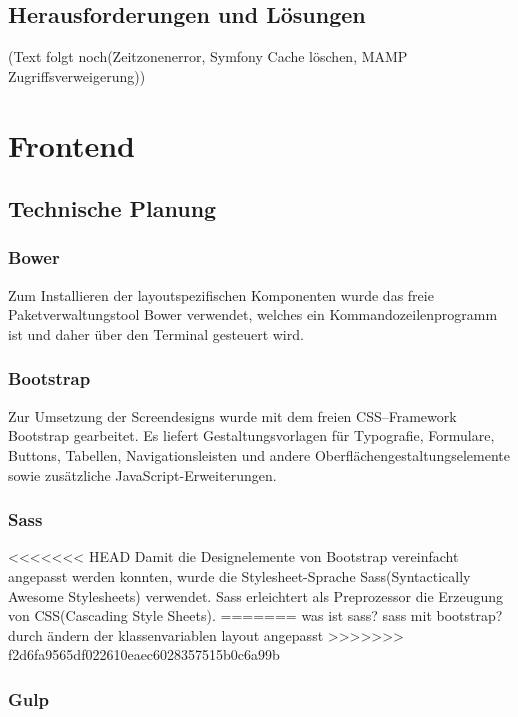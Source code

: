   \subsection{Herausforderungen und Lösungen}

(Text folgt noch(Zeitzonenerror, Symfony Cache löschen, MAMP Zugriffsverweigerung))
 
\section{Frontend}

  \subsection{Technische Planung}

    \subsubsection{Bower}

Zum Installieren der layoutspezifischen Komponenten wurde das freie Paketverwaltungstool Bower verwendet, welches ein Kommandozeilenprogramm ist und daher über den Terminal gesteuert wird. 
    
    \subsubsection{Bootstrap}

Zur Umsetzung der Screendesigns wurde mit dem freien CSS–Framework Bootstrap gearbeitet. Es liefert Gestaltungsvorlagen für Typografie, Formulare, Buttons, Tabellen, Navigationsleisten und andere Oberflächengestaltungselemente sowie zusätzliche JavaScript-Erweiterungen.

    \subsubsection{Sass}

<<<<<<< HEAD
Damit die Designelemente von Bootstrap vereinfacht angepasst werden konnten, wurde die Stylesheet-Sprache Sass(Syntactically Awesome Stylesheets) verwendet. Sass erleichtert als Preprozessor die Erzeugung von CSS(Cascading Style Sheets). 
=======
was ist sass? sass mit bootstrap?
durch ändern der klassenvariablen layout angepasst
>>>>>>> f2d6fa9565df022610eaec6028357515b0c6a99b

    \subsubsection{Gulp}

